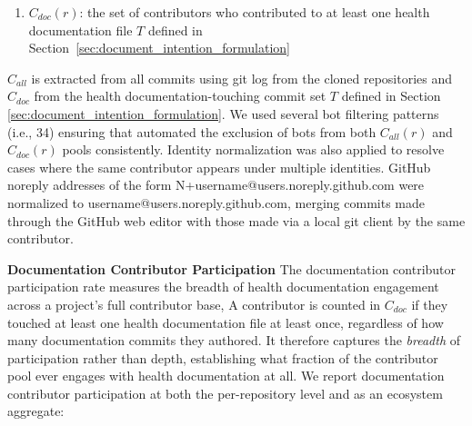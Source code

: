\documentclass[10pt,conference]{IEEEtran}
\begin{document}
{\begin{enumerate}[label=\roman*.]
  \item $C_{\mathit{doc}}(r)$: the set of contributors who contributed to at least one health documentation file $T$ defined
    in Section~\ref{sec:document_intention_formulation}
\end{enumerate}
\noindent $C_{\mathit{all}}$ is extracted from all commits using git log from the cloned repositories and $C_{\mathit{doc}}$ from the health documentation-touching commit set $T$ defined in Section \ref{sec:document_intention_formulation}. 
We used several bot filtering patterns (i.e., 34)  ensuring that automated the exclusion of bots from both  $C_{\mathit{all}}(r)$ and $C_{\mathit{doc}}(r)$  pools consistently. 
Identity normalization was also applied to resolve cases where the same contributor appears under multiple identities. GitHub noreply addresses of the form N+username@users.noreply.github.com were
normalized to username@users.noreply.github.com,
merging commits made through the GitHub web editor with
those made via a local git client by the same contributor.

\textbf{Documentation Contributor Participation}
The documentation contributor participation rate measures
the breadth of health documentation engagement across a
project's full contributor base, A contributor is counted in $C_{\mathit{doc}}$ if they touched at least one health documentation file at least once, regardless of how many documentation commits they authored. It therefore captures the \textit{breadth} of participation rather than
depth, establishing what fraction of the contributor pool ever engages with health documentation at all. We report documentation contributor participation at both the per-repository level and as an ecosystem aggregate:










}
\end{document}
